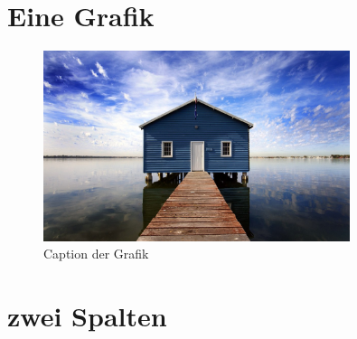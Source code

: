 





\section{Eine Grafik}

\begin{frame}
 
  \begin{figure}[h]
  \begin{center}
	  \includegraphics[width=0.8\textwidth]{figures/back.jpg}
  \end{center}
  \caption{ Caption der Grafik }
  \label{fig:openni}
  \end{figure}
  
\end{frame}




\section{zwei Spalten}


